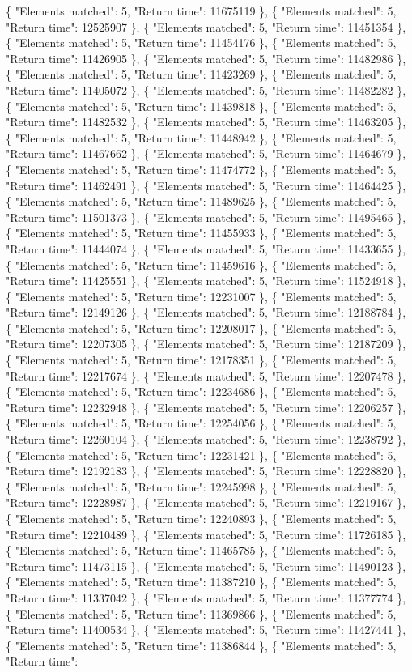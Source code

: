  \{ "Elements matched": 5, "Return time": 11675119 \}, \{ "Elements matched": 5, "Return time": 12525907 \}, \{ "Elements matched": 5, "Return time": 11451354 \}, \{ "Elements matched": 5, "Return time": 11454176 \}, \{ "Elements matched": 5, "Return time": 11426905 \}, \{ "Elements matched": 5, "Return time": 11482986 \}, \{ "Elements matched": 5, "Return time": 11423269 \}, \{ "Elements matched": 5, "Return time": 11405072 \}, \{ "Elements matched": 5, "Return time": 11482282 \}, \{ "Elements matched": 5, "Return time": 11439818 \}, \{ "Elements matched": 5, "Return time": 11482532 \}, \{ "Elements matched": 5, "Return time": 11463205 \}, \{ "Elements matched": 5, "Return time": 11448942 \}, \{ "Elements matched": 5, "Return time": 11467662 \}, \{ "Elements matched": 5, "Return time": 11464679 \}, \{ "Elements matched": 5, "Return time": 11474772 \}, \{ "Elements matched": 5, "Return time": 11462491 \}, \{ "Elements matched": 5, "Return time": 11464425 \}, \{ "Elements matched": 5, "Return time": 11489625 \}, \{ "Elements matched": 5, "Return time": 11501373 \}, \{ "Elements matched": 5, "Return time": 11495465 \}, \{ "Elements matched": 5, "Return time": 11455933 \}, \{ "Elements matched": 5, "Return time": 11444074 \}, \{ "Elements matched": 5, "Return time": 11433655 \}, \{ "Elements matched": 5, "Return time": 11459616 \}, \{ "Elements matched": 5, "Return time": 11425551 \}, \{ "Elements matched": 5, "Return time": 11524918 \}, \{ "Elements matched": 5, "Return time": 12231007 \}, \{ "Elements matched": 5, "Return time": 12149126 \}, \{ "Elements matched": 5, "Return time": 12188784 \}, \{ "Elements matched": 5, "Return time": 12208017 \}, \{ "Elements matched": 5, "Return time": 12207305 \}, \{ "Elements matched": 5, "Return time": 12187209 \}, \{ "Elements matched": 5, "Return time": 12178351 \}, \{ "Elements matched": 5, "Return time": 12217674 \}, \{ "Elements matched": 5, "Return time": 12207478 \}, \{ "Elements matched": 5, "Return time": 12234686 \}, \{ "Elements matched": 5, "Return time": 12232948 \}, \{ "Elements matched": 5, "Return time": 12206257 \}, \{ "Elements matched": 5, "Return time": 12254056 \}, \{ "Elements matched": 5, "Return time": 12260104 \}, \{ "Elements matched": 5, "Return time": 12238792 \}, \{ "Elements matched": 5, "Return time": 12231421 \}, \{ "Elements matched": 5, "Return time": 12192183 \}, \{ "Elements matched": 5, "Return time": 12228820 \}, \{ "Elements matched": 5, "Return time": 12245998 \}, \{ "Elements matched": 5, "Return time": 12228987 \}, \{ "Elements matched": 5, "Return time": 12219167 \}, \{ "Elements matched": 5, "Return time": 12240893 \}, \{ "Elements matched": 5, "Return time": 12210489 \}, \{ "Elements matched": 5, "Return time": 11726185 \}, \{ "Elements matched": 5, "Return time": 11465785 \}, \{ "Elements matched": 5, "Return time": 11473115 \}, \{ "Elements matched": 5, "Return time": 11490123 \}, \{ "Elements matched": 5, "Return time": 11387210 \}, \{ "Elements matched": 5, "Return time": 11337042 \}, \{ "Elements matched": 5, "Return time": 11377774 \}, \{ "Elements matched": 5, "Return time": 11369866 \}, \{ "Elements matched": 5, "Return time": 11400534 \}, \{ "Elements matched": 5, "Return time": 11427441 \}, \{ "Elements matched": 5, "Return time": 11386844 \}, \{ "Elements matched": 5, "Return time": 